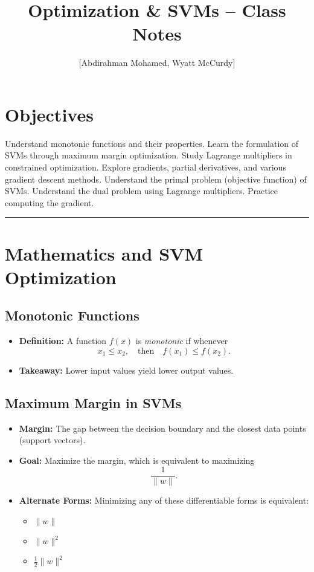\documentclass[11pt]{article}
\title{Optimization \& SVMs -- Class Notes}
\author{[Abdirahman Mohamed, Wyatt McCurdy]}
\date{}
\begin{document}
\maketitle

\section*{Objectives}
\begin{outline}
    \1 Understand monotonic functions and their properties.
    \1 Learn the formulation of SVMs through maximum margin optimization.
    \1 Study Lagrange multipliers in constrained optimization.
    \1 Explore gradients, partial derivatives, and various gradient descent methods.
    \1 Understand the primal problem (objective function) of SVMs.
    \1 Understand the dual problem using Lagrange multipliers.
    \1 Practice computing the gradient.
\end{outline}

\rule[0.0051in]{\textwidth}{0.00025in}

\section{Mathematics and SVM Optimization}

\subsection{Monotonic Functions}
\begin{itemize}
    \item \textbf{Definition:} A function \( f(x) \) is \emph{monotonic} if whenever 
    \[
    x_1 \leq x_2, \quad \text{then} \quad f(x_1) \leq f(x_2).
    \]
    \item \textbf{Takeaway:} Lower input values yield lower output values.
\end{itemize}

\subsection{Maximum Margin in SVMs}
\begin{itemize}
    \item \textbf{Margin:} The gap between the decision boundary and the closest data points (support vectors).
    \item \textbf{Goal:} Maximize the margin, which is equivalent to maximizing 
    \[
    \frac{1}{\|w\|}.
    \]
    \item \textbf{Alternate Forms:} Minimizing any of these differentiable forms is equivalent:
    \begin{itemize}
        \item \(\|w\|\)
        \item \(\|w\|^2\)
        \item \(\frac{1}{2}\|w\|^2\)
    \end{itemize}
\end{itemize}
\end{document}

